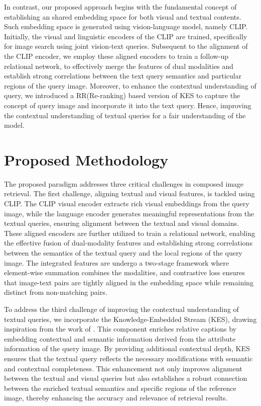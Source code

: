 \documentclass[10pt,lineno]{wlpeerj}
\begin{document}
\par In contrast, our proposed approach begins with the fundamental concept of establishing an shared embedding space for both visual and textual contents. Such embedding space is generated using vision-language model, namely CLIP\citep{CLIP}. Initially, the visual and linguistic encoders of the CLIP are trained, specifically for image search using joint vision-text queries. Subsequent to the alignment of the CLIP encoder, we employ these aligned encoders to train a follow-up relational network, to effectively merge the features of dual modalities and establish strong correlations between the text query semantics and particular regions of the query image. Moreover, to enhance the contextual understanding of query, we introduced a RR(Re-ranking)\cite{RR,GalR,DM-RR,Pic2Word} based version of KES \cite{BKP} to capture the concept of query image and incorporate it into the text query. Hence, improving the contextual understanding of textual queries for a fair understanding of the model. \color{black}

\section{Proposed Methodology}\label{sec:proposed_methodology}
The proposed paradigm addresses three critical challenges in composed image retrieval. The first challenge, aligning textual and visual features, is tackled using CLIP. The CLIP visual encoder extracts rich visual embeddings from the query image, while the language encoder generates meaningful representations from the textual queries, ensuring alignment between the textual and visual domains. These aligned encoders are further utilized to train a relational network, enabling the effective fusion of dual-modality features and establishing strong correlations between the semantics of the textual query and the local regions of the query image. The integrated features are undergo a two-stage framework where element-wise summation combines the modalities, and contrastive loss ensures that image-text pairs are tightly aligned in the embedding space while remaining distinct from non-matching pairs. 


To address the third challenge of improving the contextual understanding of textual queries, we incorporate the Knowledge-Embedded Stream (KES), drawing inspiration from the work of \cite{BKP}. This component enriches relative captions by embedding contextual and semantic information derived from the attribute information of the query image. By providing additional contextual depth, KES ensures that the textual query reflects the necessary modifications with semantic and contextual completeness. This enhancement not only improves alignment between the textual and visual queries but also establishes a robust connection between the enriched textual semantics and specific regions of the reference image, thereby enhancing the accuracy and relevance of retrieval results.
\end{document}
